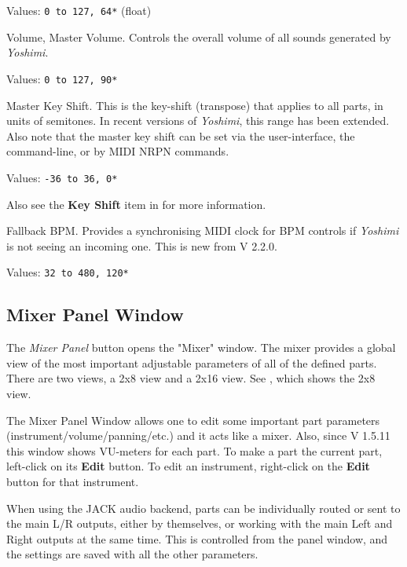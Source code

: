    Values: \texttt{0 to 127, 64*} (float)

   Volume, Master Volume.
   Controls the overall volume of all sounds generated by
   \textsl{Yoshimi}.

   Values: \texttt{0 to 127, 90*}

   Master Key Shift.
   This is the key-shift (transpose) that applies to all parts, in units of
   semitones.
   In recent versions of \textsl{Yoshimi}, this range has been extended.
   Also note that the master key shift can be set via the user-interface, the
   command-line, or by MIDI NRPN commands.

   Values: \texttt{-36 to 36, 0*}

   Also see the \textbf{Key Shift} item in
    \hspace{6 pt}for more information.


   Fallback BPM.
   Provides a synchronising MIDI clock for BPM controls if
   \textsl{Yoshimi} is not seeing an incoming one.
   This is new from V 2.2.0.

   Values: \texttt{32 to 480, 120*}


\subsection{Mixer Panel Window}
\label{subsec:mixer_panel_window}

   The \textsl{Mixer Panel} button opens the "Mixer" window.
   The mixer provides a global view of the most important
   adjustable parameters of all of the defined parts.
   There are two views, a 2x8 view and a 2x16 view.
   See , which
   shows the 2x8 view.

   The Mixer Panel Window allows one to edit some important part parameters
   (instrument/volume/panning/etc.) and it acts like a mixer. Also, since
   V 1.5.11 this window shows VU-meters for each part.
   To make a part the current part, left-click on its \textbf{Edit} button.
   To edit an instrument, right-click on the \textbf{Edit} button for that
   instrument.

   When using the JACK audio backend, parts can be individually routed or sent
   to the main L/R outputs, either by themselves, or working with the main Left
   and Right outputs at the same time.  This is controlled from the panel
   window, and the settings are saved with all the other parameters.

